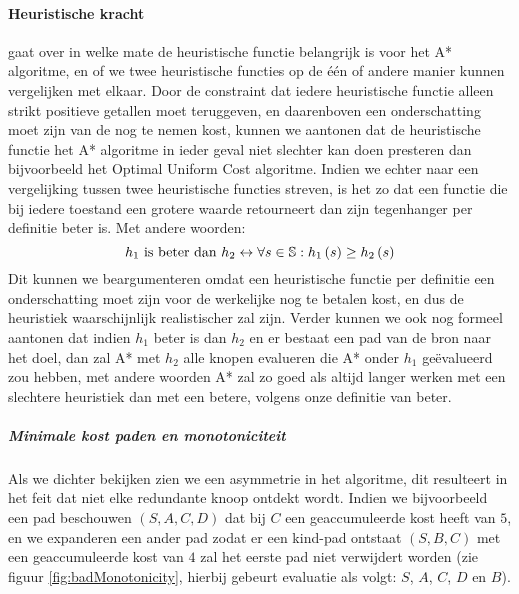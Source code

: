 \paragraph{Heuristische kracht}
 gaat over in welke mate de heuristische functie belangrijk is voor het A* algoritme, en of we twee heuristische functies op de één of andere manier kunnen vergelijken met elkaar. Door de constraint dat iedere heuristische functie alleen strikt positieve getallen moet teruggeven, en daarenboven een onderschatting moet zijn van de nog te nemen kost, kunnen we aantonen dat de heuristische functie het A* algoritme in ieder geval niet slechter kan doen presteren dan bijvoorbeeld het Optimal Uniform Cost algoritme. Indien we echter naar een vergelijking tussen twee heuristische functies streven, is het zo dat een functie die bij iedere toestand een grotere waarde retourneert dan zijn tegenhanger per definitie beter is. Met andere woorden:
\begin{equation}
 h_1 \mbox{ is beter dan } h_2\leftrightarrow\forall s\in\mathbb{S}:h_1\left(s\right)\geq h_2\left(s\right)
\end{equation}
Dit kunnen we beargumenteren omdat een heuristische functie per definitie een onderschatting moet zijn voor de werkelijke nog te betalen kost, en dus de heuristiek waarschijnlijk realistischer zal zijn. Verder kunnen we ook nog formeel aantonen dat indien $h_1$ beter is dan $h_2$ en er bestaat een pad van de bron naar het doel, dan zal A* met $h_2$ alle knopen evalueren die A* onder $h_1$ geëvalueerd zou hebben, met andere woorden A* zal zo goed als altijd langer werken met een slechtere heuristiek dan met een betere, volgens onze definitie van beter.
\subparagraph{Minimale kost paden en monotoniciteit}
Als we  dichter bekijken zien we een asymmetrie in het algoritme, dit resulteert in het feit dat niet elke redundante knoop ontdekt wordt. Indien we bijvoorbeeld een pad beschouwen $\left(S,A,C,D\right)$ dat bij $C$ een geaccumuleerde kost heeft van $5$, en we expanderen een ander pad zodat er een kind-pad ontstaat $\left(S,B,C\right)$ met een geaccumuleerde kost van $4$ zal het eerste pad niet verwijdert worden (zie figuur \ref{fig:badMonotonicity}, hierbij gebeurt evaluatie als volgt: $S$, $A$, $C$, $D$ en $B$).
